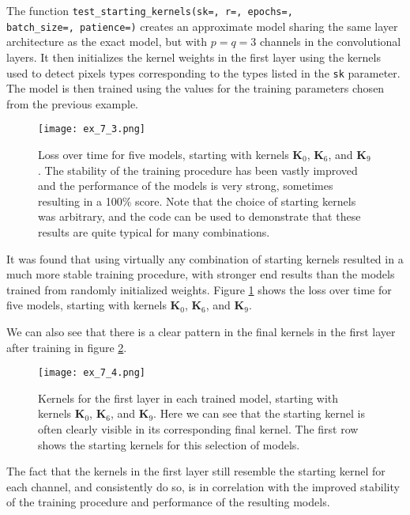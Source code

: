 \documentclass{somasmsc}
\begin{document}
\begin{exa}
The function \verb|test_starting_kernels(sk=, r=, epochs=,| \\ \verb|batch_size=, patience=)| creates an approximate model sharing the same layer architecture as the exact model, but with $p=q=3$ channels in the convolutional layers. It then initializes the kernel weights in the first layer using the kernels used to detect pixels types corresponding to the types listed in the \verb|sk| parameter. The model is then trained using the values for the training parameters chosen from the previous example.

\begin{figure}[H]\label{digit:ex_7_3}
\begin{center}
\texttt{[image: ex\_7\_3.png]}
\end{center}
\caption{Loss over time for five models, starting with kernels $\mathbf{K}_0$, $\mathbf{K}_6$, and $\mathbf{K}_9$. The stability of the training procedure has been vastly improved and the performance of the models is very strong, sometimes resulting in a 100\% score. Note that the choice of starting kernels was arbitrary, and the code can be used to demonstrate that these  results are quite typical for many combinations.}
\end{figure}

It was found that using virtually any combination of starting kernels resulted in a much more stable training procedure, with stronger end results than the models trained from randomly initialized weights. Figure \ref{digit:ex_7_3} shows the loss over time for five models, starting with kernels $\mathbf{K}_0$, $\mathbf{K}_6$, and $\mathbf{K}_9$.

We can also see that there is a clear pattern in the final kernels in the first layer after training in figure \ref{digit:ex_7_4}.

\begin{figure}[H]\label{digit:ex_7_4}
\begin{center}
\texttt{[image: ex\_7\_4.png]}
\end{center}
\caption{Kernels for the first layer in each trained model, starting with kernels $\mathbf{K}_0$, $\mathbf{K}_6$, and $\mathbf{K}_9$. Here we can see that the starting kernel is often clearly visible in its corresponding final kernel. The first row shows the starting kernels for this selection of models.}
\end{figure}

The fact that the kernels in the first layer still resemble the starting kernel for each channel, and consistently do so, is in correlation with the improved stability of the training procedure and performance of the resulting models.
\end{exa}
\end{document}
